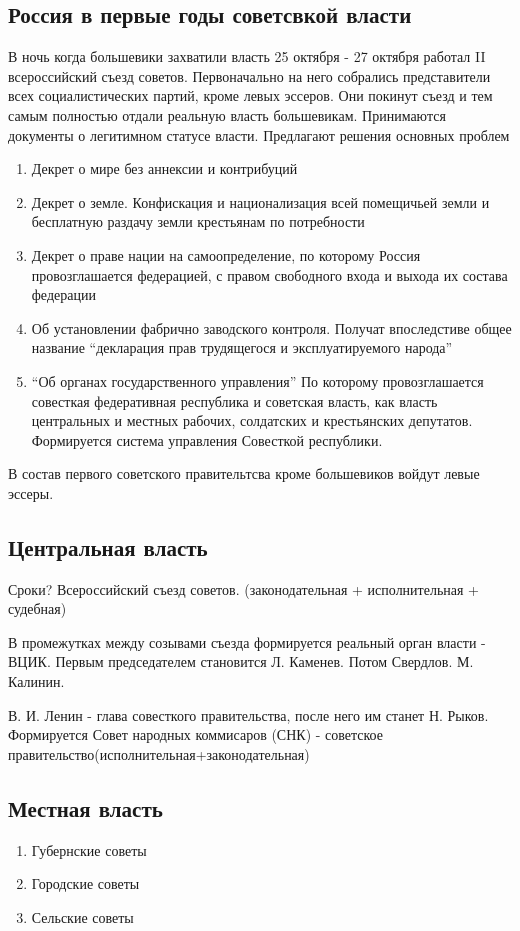 \documentclass[a4paper]{article}
\begin{document}
\subsection{Россия в первые годы советсвкой власти}
В ночь когда большевики захватили власть
25 октября - 27 октября работал II всероссийский съезд советов. Первоначально на него собрались представители всех социалистических партий, кроме левых эссеров. Они покинут съезд и тем самым полностью отдали реальную власть большевикам.
Принимаются документы о легитимном статусе власти.
Предлагают решения основных проблем
\begin{enumerate}
    \item Декрет о мире без аннексии и контрибуций
    \item Декрет о земле. Конфискация и национализация всей помещичьей земли и бесплатную раздачу земли крестьянам по потребности
    \item Декрет о праве нации на самоопределение, по которому Россия провозглашается федерацией, с правом свободного входа и выхода их состава федерации
    \item Об установлении фабрично заводского контроля.
    Получат впоследстиве общее название ``декларация прав трудящегося и эксплуатируемого народа''
    \item ``Об органах государственного управления''
    По которому провозглашается совесткая федеративная республика и советская власть, как власть центральных и местных рабочих, солдатских и крестьянских депутатов. Формируется система управления Совесткой республики.
\end{enumerate}

В состав первого советского правительтсва кроме большевиков войдут левые эссеры.

\subsection{Центральная власть}
Сроки? Всероссийский съезд советов. (законодательная + исполнительная + судебная)

В промежутках между созывами съезда формируется реальный орган власти - ВЦИК.
Первым председателем становится Л. Каменев. Потом Свердлов. М. Калинин.

В. И. Ленин - глава совесткого правительства, после него им станет Н. Рыков. Формируется Совет народных коммисаров (СНК) - советское правительство(исполнительная+законодательная)

\subsection{Местная власть}
\begin{enumerate}
    \item Губернские советы
    \item Городские советы
    \item Сельские советы
\end{enumerate}
\end{document}
